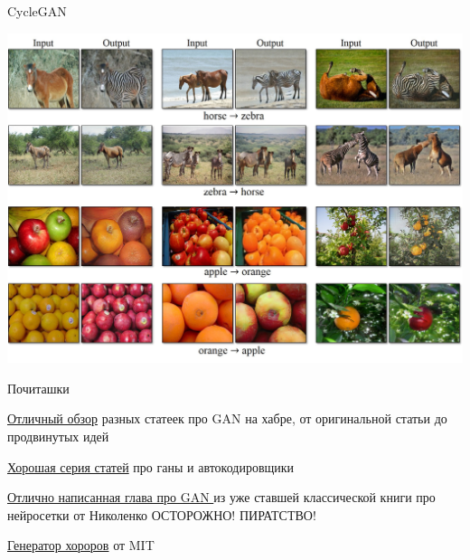 \documentclass[notes,12pt, aspectratio=169]{beamer}
\newenvironment{wideitemize}{\itemize\addtolength{\itemsep}{10pt}}{\enditemize}
\begin{document}
\begin{frame}{CycleGAN}
\begin{center}
	\includegraphics[width=.7\linewidth]{cycle_gan.jpg}
\end{center}
\end{frame}

\begin{frame}{Почиташки}
\begin{wideitemize}
	\item   {\color{blue}  \href{https://habr.com/ru/company/ods/blog/322514/}{Отличный обзор} }  разных статеек про GAN на хабре, от оригинальной статьи до продвинутых идей 
	
	\item   {\color{blue}  \href{https://habr.com/ru/post/331382/}{{Хорошая серия статей}}} про ганы и автокодировщики 
	
	\item    {\color{blue}  \href{https://drive.google.com/file/d/1TLgtJYIs7hmDwrjbqhCjCrVmGUbc6orI/view}{Отлично написанная глава про GAN }} из уже ставшей классической книги про нейросетки от Николенко \newline \alert{ОСТОРОЖНО! ПИРАТСТВО!} 
		
	\item   {\color{blue}  \href{http://nightmare.mit.edu/}{{Генератор хороров}}} от MIT
			
	
\end{wideitemize}
\end{frame}
\end{document}
